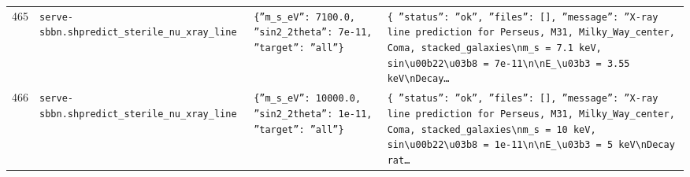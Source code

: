 \documentclass[11pt,a4paper]{article}
\begin{document}
\begin{longtable}{@{}p{}p{}p{}p{}@{}}
465 & \texttt{serve-sbbn.sh}\newline\texttt{predict\_\allowbreak{}sterile\_\allowbreak{}nu\_\allowbreak{}xray\_\allowbreak{}line} & \texttt{\{''m\_\allowbreak{}s\_\allowbreak{}eV'':\allowbreak{} 7100.0,\allowbreak{} ''sin2\_\allowbreak{}2theta'':\allowbreak{} 7e-11,\allowbreak{} ''target'':\allowbreak{} ''all''\}\allowbreak{}} & \texttt{\{   ''status'':\allowbreak{} ''ok'',\allowbreak{}   ''files'':\allowbreak{} []\allowbreak{},\allowbreak{}   ''message'':\allowbreak{} ''X-ray line prediction for Perseus,\allowbreak{} M31,\allowbreak{} Milky\_\allowbreak{}Way\_\allowbreak{}center,\allowbreak{} Coma,\allowbreak{} stacked\_\allowbreak{}galaxies\textbackslash{}\allowbreak{}nm\_\allowbreak{}s =\allowbreak{} 7.1 keV,\allowbreak{} sin\textbackslash{}\allowbreak{}u00b22\textbackslash{}\allowbreak{}u03b8 =\allowbreak{} 7e-11\textbackslash{}\allowbreak{}n\textbackslash{}\allowbreak{}nE\_\allowbreak{}\textbackslash{}\allowbreak{}u03b3 =\allowbreak{} 3.55 keV\textbackslash{}\allowbreak{}nDecay\ldots{}\allowbreak{}} \\
466 & \texttt{serve-sbbn.sh}\newline\texttt{predict\_\allowbreak{}sterile\_\allowbreak{}nu\_\allowbreak{}xray\_\allowbreak{}line} & \texttt{\{''m\_\allowbreak{}s\_\allowbreak{}eV'':\allowbreak{} 10000.0,\allowbreak{} ''sin2\_\allowbreak{}2theta'':\allowbreak{} 1e-11,\allowbreak{} ''target'':\allowbreak{} ''all''\}\allowbreak{}} & \texttt{\{   ''status'':\allowbreak{} ''ok'',\allowbreak{}   ''files'':\allowbreak{} []\allowbreak{},\allowbreak{}   ''message'':\allowbreak{} ''X-ray line prediction for Perseus,\allowbreak{} M31,\allowbreak{} Milky\_\allowbreak{}Way\_\allowbreak{}center,\allowbreak{} Coma,\allowbreak{} stacked\_\allowbreak{}galaxies\textbackslash{}\allowbreak{}nm\_\allowbreak{}s =\allowbreak{} 10 keV,\allowbreak{} sin\textbackslash{}\allowbreak{}u00b22\textbackslash{}\allowbreak{}u03b8 =\allowbreak{} 1e-11\textbackslash{}\allowbreak{}n\textbackslash{}\allowbreak{}nE\_\allowbreak{}\textbackslash{}\allowbreak{}u03b3 =\allowbreak{} 5 keV\textbackslash{}\allowbreak{}nDecay rat\ldots{}\allowbreak{}} \\

\end{longtable}
\end{document}
